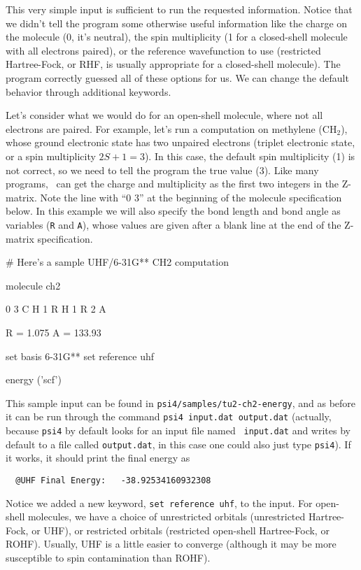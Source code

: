This very simple input is sufficient to run the requested information.
Notice that we didn't tell the program some otherwise useful information
like the charge on the molecule (0, it's neutral), the spin multiplicity
(1 for a closed-shell molecule with all electrons paired), or the reference
wavefunction to use (restricted Hartree-Fock, or RHF, is usually
appropriate for a closed-shell molecule).  The program correctly guessed
all of these options for us.  We can change the default behavior through
additional keywords.  

Let's consider what we would do for an open-shell molecule, where
not all electrons are paired.  For example, let's run a computation
on methylene (CH$_2$), whose ground electronic state has two unpaired
electrons (triplet electronic state, or a spin multiplicity $2S+1 = 3$).
In this case, the default spin multiplicity (1) is not correct, so we
need to tell the program the true value (3).  Like many programs, \PSIfour\
can get the charge and multiplicity as the first two integers in the
Z-matrix.  Note the line with ``0 3'' at the beginning of the molecule
specification below.  In this example we will also specify the bond length
and bond angle as variables ({\tt R} and {\tt A}), whose values are given
after a blank line at the end of the Z-matrix specification.

\begin{Snippet}
# Here's a sample UHF/6-31G** CH2 computation

molecule ch2 {
  0 3
  C
  H 1 R
  H 1 R 2 A

  R = 1.075
  A = 133.93
}

set basis 6-31G**
set reference uhf

energy ('scf')
\end{Snippet}

This sample input can be found in {\tt psi4/samples/tu2-ch2-energy}, and as
before it can be run through the command {\tt psi4 input.dat output.dat}
(actually, because {\tt psi4} by default looks for an input file named {\tt
input.dat} and writes by default to a file called {\tt output.dat}, in this
case one could also just type {\tt psi4}).  If it works, it should print
the final energy as
\begin{verbatim}
  @UHF Final Energy:   -38.92534160932308
\end{verbatim}
Notice we added a new keyword, {\tt set reference uhf}, to the input.  For
open-shell molecules, we have a choice of unrestricted orbitals
(unrestricted Hartree-Fock, or UHF), or restricted orbitals (restricted
open-shell Hartree-Fock, or ROHF).  Usually, UHF is a little easier to
converge (although it may be more susceptible to spin contamination than
ROHF).

